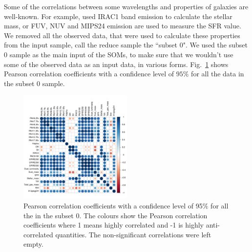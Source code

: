      
     
     Some of the correlations between some wavelengths and properties of galaxies are well-known.
     For example, \citep{Rahmani16} used IRAC1 band emission to calculate the stellar mass, or FUV, NUV and MIPS24 emission are used to measure the SFR value. 
     We removed all the observed data, that were used to calculate these properties from the input sample, call the reduce sample the ``subset 0".
     We used the subset 0 sample as the main input of the SOMs, to make sure that we wouldn't use some of the observed data as an input data, in various forms.
     Fig.~\ref{fig: cor_all} shows Pearson correlation coefficients with a confidence level of $95\%$ for all the data in the subset 0 sample.
     
     
     
     
     
     
      \begin{figure}
                \centering
                \includegraphics[width=0.5\textwidth]{../images0.01/cor_plots/M31_all_derived_ones_core_plot_for_paper.pdf}
            \caption{Pearson correlation coefficients with a confidence level of 95$\%$ for all the in the subset 0. The colours show the Pearson correlation coefficients where 1 means highly correlated and -1 is highly anti-correlated quantities. The non-significant correlations were left empty.}
            \label{fig: cor_all}
        \end{figure}
 

